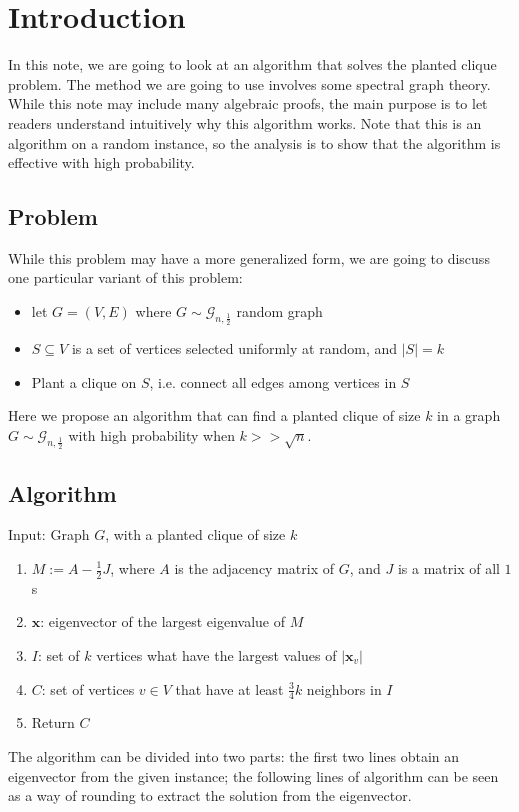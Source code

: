 \documentclass{article}
\begin{document}


\section{Introduction}
In this note, we are going to look at an algorithm that solves the planted
clique problem. The method we are going to use involves some spectral graph
theory. While this note may include many algebraic proofs, the main purpose is
to let readers understand intuitively why this algorithm works. Note that this
is an algorithm on a random instance, so the analysis is to show that the algorithm is effective with high probability. 

\subsection{Problem}
While this problem may have a more generalized form, we are going to discuss
one particular variant of this problem:
\begin{itemize}
    \item let $G = (V, E)$ where $G \sim \mathcal{G}_{n, \frac{1}{2}}$ random graph
    \item $S \subseteq V$ is a set of vertices selected uniformly at random, and $|S| = k$
    \item Plant a clique on $S$, i.e. connect all edges among vertices in $S$
\end{itemize}

Here we propose an algorithm that can find a planted clique of size $k$ in a
graph $G
\sim \mathcal{G}_{n,\frac{1}{2}}$ with high probability when $k >> \sqrt{n}$.

\subsection{Algorithm}
Input: Graph $G$, with a planted clique of size $k$
\begin{enumerate}
  \item $M := A - \frac{1}{2}J$, where $A$ is the adjacency matrix of $G$, and
      $J$ is a matrix of all $1$s
  \item $\mathbf{x}$: eigenvector of the largest eigenvalue of $M$
  \item $I$: set of $k$ vertices what have the largest values of $|\mathbf{x}_v|$ 
  \item $C$: set of vertices $v \in V$ that have at least $\frac{3}{4}k$
      neighbors in $I$
  \item Return $C$
\end{enumerate}
The algorithm can be divided into two parts: the first two lines obtain an
eigenvector from the given instance; the following lines of algorithm can be
seen as a way of rounding to extract the solution from the eigenvector. 
\end{document}
